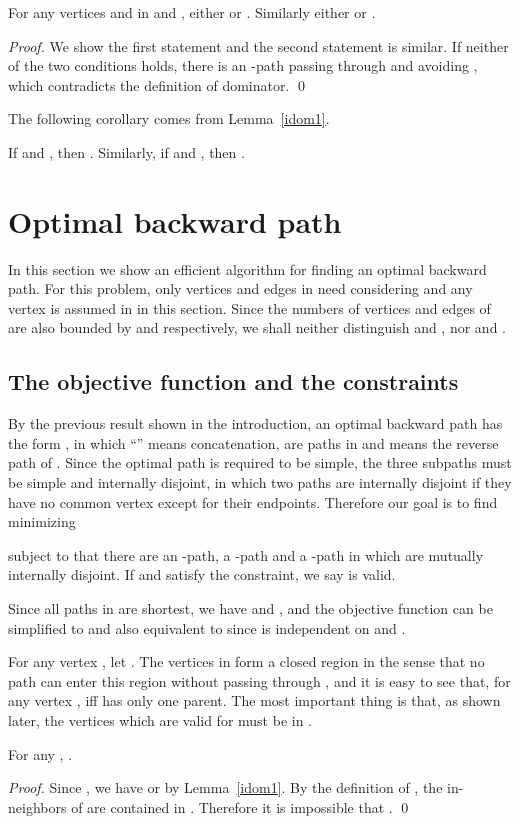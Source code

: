 \begin{lemma}\label{idom1}
For any vertices  and  in  and , either  or .
Similarly either  or .
\end{lemma}
\begin{proof}
We show the first statement and the second statement is similar.
If neither of the two conditions holds, there is an -path passing through  and avoiding , which contradicts the definition of dominator.
\qed\end{proof}

The following corollary comes from Lemma~\ref{idom1}.
\begin{corollary}\label{idom2}
If  and , then .
Similarly,
if  and , then .
\end{corollary}

\section{Optimal backward path}
In this section we show an efficient algorithm for finding an optimal backward path.
For this problem, only vertices and edges in  need considering and any vertex is assumed in  in this section.
Since the numbers of vertices and edges of  are also bounded by  and  respectively, we shall neither distinguish  and , nor  and .

\subsection{The objective function and the constraints} 

By the previous result shown in the introduction, an optimal backward path has the form , in which ``'' means concatenation,  are paths in  and  means the reverse path of . Since the optimal path is required to be simple, the three subpaths must be simple and internally disjoint, in which two paths are internally disjoint if they have no common vertex except for their endpoints. Therefore our goal is to find  minimizing 

subject to that there are an -path, a -path and a -path in  which are mutually internally disjoint. 
If  and  satisfy the constraint, we say  is valid. 

Since all paths in  are shortest, we have  and , and the objective function can be simplified to  and also equivalent to  since  is independent on  and .

For any vertex , let .
The vertices in  form a closed region in the sense that no path can enter this region without passing through , and it is easy to see that, for any vertex ,  iff  has only one parent.
The most important thing is that, as shown later, the vertices which are valid for  must be in . 
\begin{lemma}\label{hier}
For any , .
\end{lemma}
\begin{proof}
Since , we have  or  by Lemma~\ref{idom1}.
By the definition of , the in-neighbors of  are contained in .
Therefore it is impossible that .
\qed\end{proof}

